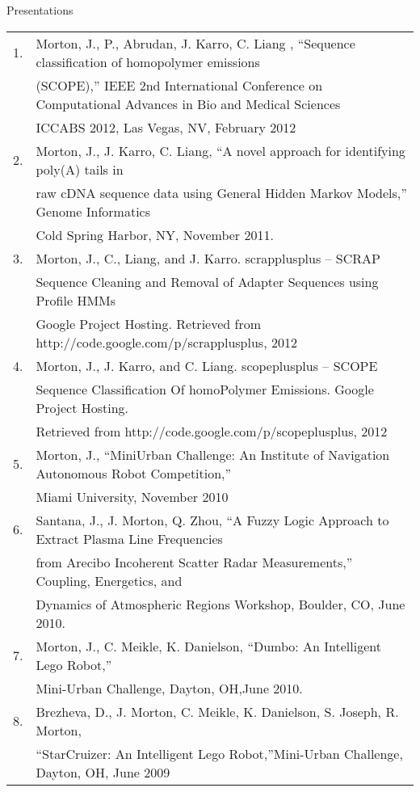 \documentclass{resume} %
\begin{document}
\begin{rSection}{Presentations}
  \begin{tabular}{ll}
    1.  & Morton, J., P., Abrudan, J. Karro, C. Liang , “Sequence classification of homopolymer emissions \\
        & (SCOPE),” IEEE 2nd International Conference on Computational Advances in Bio and Medical Sciences\\
        &  ICCABS 2012, Las Vegas, NV, February 2012\\
    2.  & Morton, J., J. Karro, C. Liang, “A novel approach for identifying poly(A) tails in \\
        & raw cDNA sequence data using General Hidden Markov Models,” Genome Informatics \\
        & Cold Spring Harbor, NY, November 2011.\\
    3.  & Morton, J., C., Liang, and J. Karro. scrapplusplus -- SCRAP \\
        & Sequence Cleaning and Removal of Adapter Sequences using Profile HMMs\\
        & Google Project Hosting. Retrieved from http://code.google.com/p/scrapplusplus, 2012\\
    4.  & Morton, J., J. Karro, and C. Liang. scopeplusplus -- SCOPE \\
        & Sequence Classification Of homoPolymer Emissions. Google Project Hosting.\\
        & Retrieved from http://code.google.com/p/scopeplusplus, 2012\\
    5.  & Morton, J., “MiniUrban Challenge: An Institute of Navigation Autonomous Robot Competition,”\\
        & Miami University, November 2010 \\
    6.  & Santana, J., J. Morton, Q. Zhou, “A Fuzzy Logic Approach to Extract Plasma Line Frequencies\\
        & from Arecibo Incoherent Scatter Radar Measurements,” Coupling, Energetics, and \\
        & Dynamics of Atmospheric Regions Workshop, Boulder, CO, June 2010.\\
    7.  & Morton, J., C. Meikle, K. Danielson, “Dumbo: An Intelligent Lego Robot,”\\
        & Mini-Urban Challenge, Dayton, OH,June 2010.\\
    8.  & Brezheva, D., J. Morton, C. Meikle, K. Danielson, S. Joseph, R. Morton,\\
        & “StarCruizer: An Intelligent Lego Robot,”Mini-Urban Challenge, Dayton, OH, June 2009\\
  \end{tabular}
\end{rSection}
\end{document}
